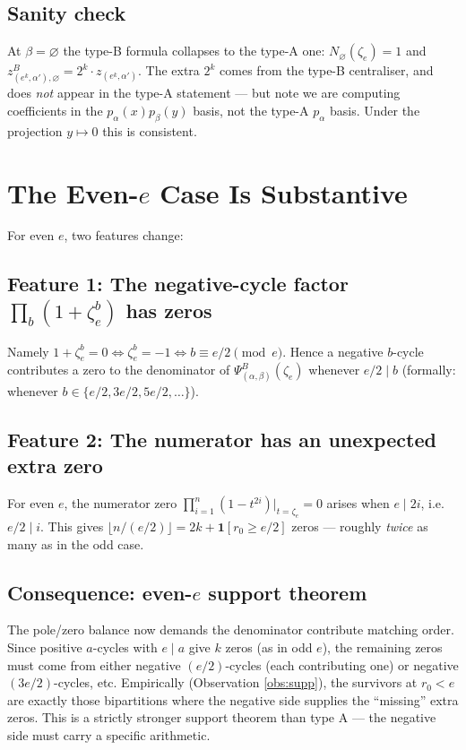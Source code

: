 \documentclass[11pt]{article}
\theoremstyle{remark}
\newcommand{\zetae}{\zeta_e}
\newcommand{\one}{\mathbf{1}}
\newcommand{\emptyy}{\varnothing}
\begin{document}
\subsection*{Sanity check}

At $\beta = \emptyy$ the type-B formula collapses to the type-A one: $N_\emptyy(\zetae) = 1$ and $z^B_{(e^k, \alpha'), \emptyy} = 2^k \cdot z_{(e^k, \alpha')}$. The extra $2^k$ comes from the type-B centraliser, and does \emph{not} appear in the type-A statement --- but note we are computing coefficients in the $p_\alpha(x) p_\beta(y)$ basis, not the type-A $p_\alpha$ basis. Under the projection $y \mapsto 0$ this is consistent.

\section{The Even-$e$ Case Is Substantive}

For even $e$, two features change:

\subsection*{Feature 1: The negative-cycle factor $\prod_b(1 + \zetae^b)$ has zeros}

Namely $1 + \zetae^b = 0 \iff \zetae^b = -1 \iff b \equiv e/2 \pmod e$. Hence a negative $b$-cycle contributes a zero to the denominator of $\Psi^B_{(\alpha, \beta)}(\zetae)$ whenever $e/2 \mid b$ (formally: whenever $b \in \{e/2, 3e/2, 5e/2, \ldots\}$).

\subsection*{Feature 2: The numerator has an unexpected extra zero}

For even $e$, the numerator zero $\prod_{i=1}^n(1-t^{2i})|_{t = \zetae} = 0$ arises when $e \mid 2i$, i.e.\ $e/2 \mid i$. This gives $\lfloor n/(e/2) \rfloor = 2k + \one[r_0 \ge e/2]$ zeros --- roughly \emph{twice} as many as in the odd case.

\subsection*{Consequence: even-$e$ support theorem}

The pole/zero balance now demands the denominator contribute matching order. Since positive $a$-cycles with $e \mid a$ give $k$ zeros (as in odd $e$), the remaining zeros must come from either negative $(e/2)$-cycles (each contributing one) or negative $(3e/2)$-cycles, etc. Empirically (Observation \ref{obs:supp}), the survivors at $r_0 < e$ are exactly those bipartitions where the negative side supplies the ``missing'' extra zeros. This is a strictly stronger support theorem than type A --- the negative side must carry a specific arithmetic.
\end{document}
